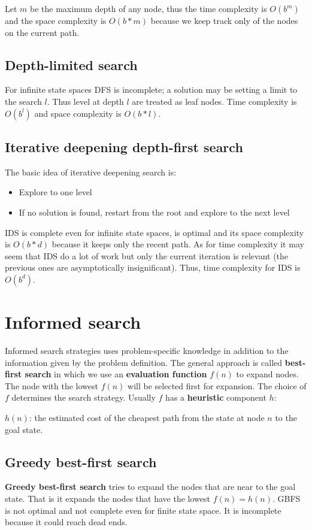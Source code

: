 \documentclass[a4paper, 11pt]{article}
\begin{document}
Let $m$ be the maximum depth of any node, thus the time complexity is $O(b^m)$ and the space complexity is $O(b*m)$ because we keep track only of the nodes on the current path.

\subsection*{Depth-limited search}
For infinite state spaces DFS is incomplete; a solution may be setting a limit to the search $l$. Thus level at depth $l$ are treated as leaf nodes. Time complexity is $O(b^l)$ and space complexity is $O(b*l)$.

\subsection*{Iterative deepening depth-first search}
The basic idea of iterative deepening search is:
\begin{itemize}
  \item Explore to one level
  \item If no solution is found, restart from the root and explore to the next level
\end{itemize}

IDS is complete even for infinite state spaces, is optimal and its space complexity is $O(b*d)$ because it keeps only the recent path. As for time complexity it may seem that IDS do a lot of work but only the current iteration is relevant (the previous ones are asymptotically insignificant). Thus, time complexity for IDS is $O(b^d)$.

\section{Informed search}
Informed search strategies uses problem-specific knowledge in addition to the information given by the problem definition.
The general approach is called \textbf{best-first search} in which we use an \textbf{evaluation function} $f(n)$ to expand nodes. The node with the lowest $f(n)$ will be selected first for expansion. The choice of $f$ determines the search strategy. Usually $f$ has a \textbf{heuristic} component $h$:

\indent $h(n)$: the estimated cost of the cheapest path from the state at node $n$ to the goal state.

\subsection*{Greedy best-first search}
\textbf{Greedy best-first search} tries to expand the nodes that are near to the goal state. That is it expands the nodes that have the lowest $f(n) = h(n)$.
GBFS is not optimal and not complete even for finite state space. It is incomplete because it could reach dead ends.
\end{document}
